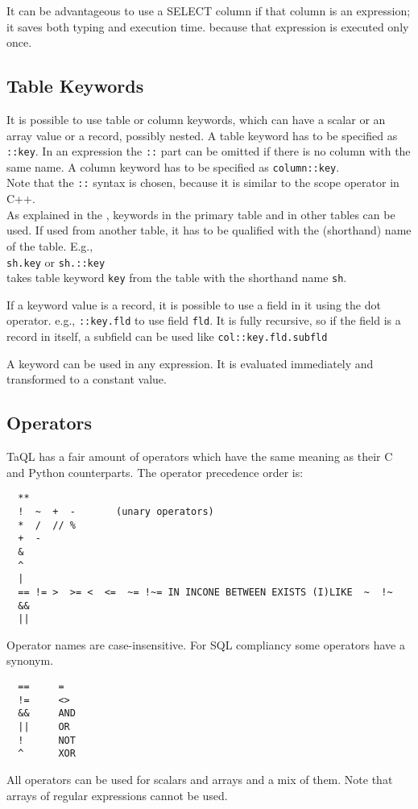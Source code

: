 It can be advantageous to use a SELECT column if that column
is an expression; it saves both typing and execution time.
 because that
expression is executed only once.

\subsection{\label{TAQL:KEYWORDS}Table Keywords}
It is possible to use table or column keywords, which can have
a scalar or an array value or a record, possibly nested.
A table keyword has to be specified
as \texttt{::key}. In an expression the \texttt{::} part can be omitted
if there is no column with the same name.
A column keyword has to be specified as \texttt{column::key}.
\\Note that the \texttt{::} syntax is chosen, because it is similar
to the scope operator in C++.
\\
As explained in the ,
keywords in the primary table and in other tables
can be used. If used from another table, it has to be qualified
with the (shorthand) name of the table. E.g.,
\\\texttt{sh.key} or \texttt{sh.::key}
\\takes table keyword \texttt{key} from the table with the shorthand name
\texttt{sh}.

If a keyword value is a record, it is possible to use
a field in it using the dot operator. e.g., \texttt{::key.fld}
to use field \texttt{fld}. It is fully recursive, so if the
field is a record in itself, a subfield can be used like
\texttt{col::key.fld.subfld}

A keyword can be used in any expression. It is evaluated immediately
and transformed to a constant value.

\subsection{\label{TAQL:OPERATORS}Operators}
TaQL has a fair amount of operators which have the same meaning as
their C and Python counterparts.
The operator precedence order is:
\begin{verbatim}
  **
  !  ~  +  -       (unary operators)
  *  /  // %
  +  -
  &
  ^
  |
  == != >  >= <  <=  ~= !~= IN INCONE BETWEEN EXISTS (I)LIKE  ~  !~
  &&
  ||
\end{verbatim}
Operator names are case-insensitive.
For SQL compliancy some operators have a synonym.
\begin{verbatim}
  ==     =
  !=     <>
  &&     AND
  ||     OR
  !      NOT
  ^      XOR
\end{verbatim}
All operators can be used for scalars and arrays and a mix of them.
Note that arrays of regular expressions cannot be used.

